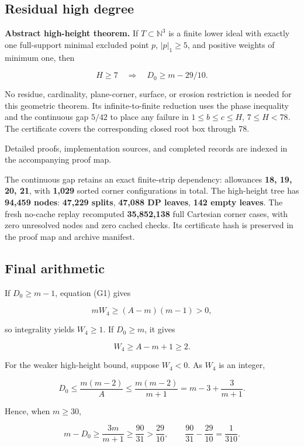 \documentclass[
  11pt,
  a4paper,
]{article}
\begin{document}
\hypertarget{residual-high-degree}{%
\subsection{Residual high degree}\label{residual-high-degree}}

\textbf{Abstract high-height theorem.} If \(T\subset\mathbb N^3\) is a
finite lower ideal with exactly one full-support minimal excluded point
\(p\), \(|p|_1\ge5\), and positive weights of minimum one, then

\[
H\ge7\quad\Longrightarrow\quad D_0\ge m-29/10.
\]

No residue, cardinality, plane-corner, surface, or erosion restriction
is needed for this geometric theorem. Its infinite-to-finite reduction
uses the phase inequality and the continuous gap \(5/42\) to place any
failure in \(1\le b\le c\le H\), \(7\le H<78\). The certificate covers
the corresponding closed root box through 78.

Detailed proofs, implementation sources, and completed records are
indexed in the accompanying proof map.

The continuous gap retains an exact finite-strip dependency: allowances
\textbf{18, 19, 20, 21}, with \textbf{1,029} sorted corner
configurations in total. The high-height tree has \textbf{94,459 nodes}:
\textbf{47,229 splits}, \textbf{47,088 DP leaves}, \textbf{142 empty
leaves}. The fresh no-cache replay recomputed \textbf{35,852,138} full
Cartesian corner cases, with zero unresolved nodes and zero cached
checks. Its certificate hash is preserved in the proof map and archive
manifest.

\hypertarget{final-arithmetic}{%
\subsection{Final arithmetic}\label{final-arithmetic}}

If \(D_0\ge m-1\), equation (G1) gives

\[
mW_4\ge(A-m)(m-1)>0,
\]

so integrality yields \(W_4\ge1\). If \(D_0\ge m\), it gives

\[
W_4\ge A-m+1\ge2.
\]

For the weaker high-height bound, suppose \(W_4<0\). As \(W_4\) is an
integer,

\[
D_0\le\frac{m(m-2)}A\le\frac{m(m-2)}{m+1}
=m-3+\frac3{m+1}.
\]

Hence, when \(m\ge30\),

\[
m-D_0\ge\frac{3m}{m+1}\ge\frac{90}{31}>
\frac{29}{10},\qquad \frac{90}{31}-\frac{29}{10}=\frac1{310}.
\]
\end{document}
